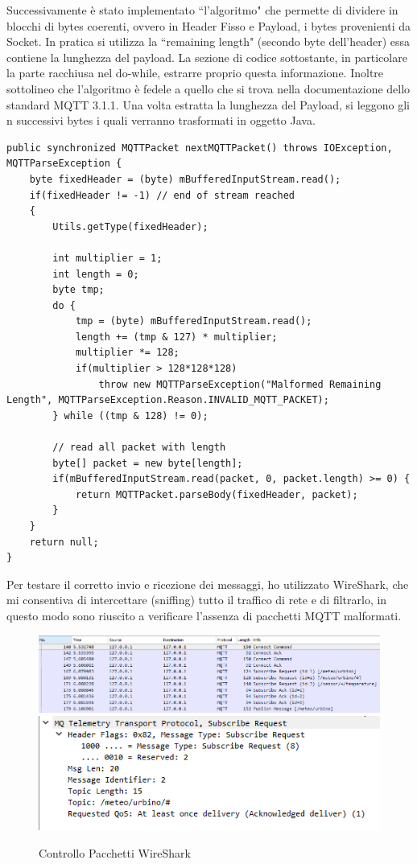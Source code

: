 \documentclass{article}
\begin{document}
Successivamente è stato implementato ``l'algoritmo" che permette di dividere in blocchi di bytes coerenti, ovvero in Header Fisso e Payload, i bytes provenienti da Socket. In pratica si utilizza la ``remaining length" (secondo byte dell'header) essa contiene la lunghezza del payload. La sezione di codice sottostante, in particolare la parte racchiusa nel do-while, estrarre proprio questa informazione. Inoltre sottolineo che l'algoritmo è fedele a quello che si trova nella documentazione dello standard MQTT 3.1.1. Una volta estratta la lunghezza del Payload, si leggono gli n successivi bytes i quali verranno trasformati in oggetto Java. 
\begin{lstlisting}[style=JavaStyle]
public synchronized MQTTPacket nextMQTTPacket() throws IOException, MQTTParseException {
	byte fixedHeader = (byte) mBufferedInputStream.read();
	if(fixedHeader != -1) // end of stream reached
	{
		Utils.getType(fixedHeader);
		
		int multiplier = 1;
		int length = 0;
		byte tmp;
		do {
			tmp = (byte) mBufferedInputStream.read();
			length += (tmp & 127) * multiplier;
			multiplier *= 128;
			if(multiplier > 128*128*128)
				throw new MQTTParseException("Malformed Remaining Length", MQTTParseException.Reason.INVALID_MQTT_PACKET);
		} while ((tmp & 128) != 0);
		
		// read all packet with length
		byte[] packet = new byte[length];
		if(mBufferedInputStream.read(packet, 0, packet.length) >= 0) {
			return MQTTPacket.parseBody(fixedHeader, packet);
		}
	}
	return null;
}
\end{lstlisting}
Per testare il corretto invio e ricezione dei messaggi, ho utilizzato WireShark, che mi consentiva di intercettare (sniffing) tutto il traffico di rete e di filtrarlo, in questo modo sono riuscito a verificare l'assenza di pacchetti MQTT malformati.
\begin{figure}[htbp]
	\includegraphics[scale=0.6]{immagini/wireshark1.png}
	\includegraphics[scale=0.6]{immagini/wireshark2.png}
	\caption{Controllo Pacchetti WireShark}
\end{figure}
\end{document}
